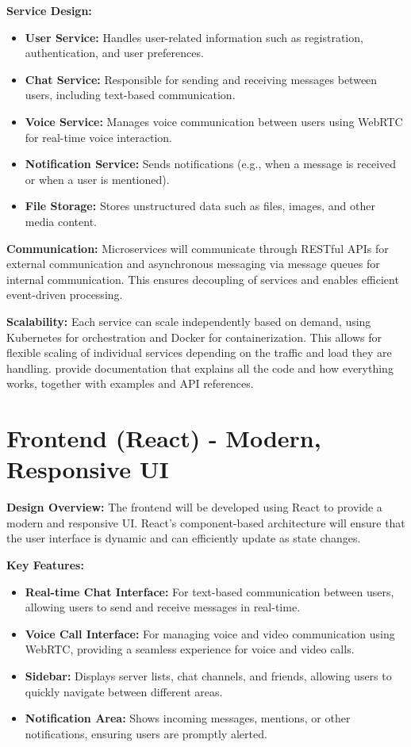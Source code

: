 \documentclass[12pt]{report}
\begin{document}
\textbf{Service Design:}
\begin{itemize}
    \item \textbf{User Service:} Handles user-related information such as registration, authentication, and user preferences.
    \item \textbf{Chat Service:} Responsible for sending and receiving messages between users, including text-based communication.
    \item \textbf{Voice Service:} Manages voice communication between users using WebRTC for real-time voice interaction.
    \item \textbf{Notification Service:} Sends notifications (e.g., when a message is received or when a user is mentioned).
    \item \textbf{File Storage:} Stores unstructured data such as files, images, and other media content.
\end{itemize}

\textbf{Communication:} Microservices will communicate through RESTful APIs for external communication and asynchronous messaging via message queues for internal communication. This ensures decoupling of services and enables efficient event-driven processing.

\textbf{Scalability:} Each service can scale independently based on demand, using Kubernetes for orchestration and Docker for containerization. This allows for flexible scaling of individual services depending on the traffic and load they are handling.
 provide documentation that explains all the code and how everything works, together with examples and API references. 

\section{Frontend (React) - Modern, Responsive UI}

\textbf{Design Overview:} The frontend will be developed using React to provide a modern and responsive UI. React's component-based architecture will ensure that the user interface is dynamic and can efficiently update as state changes.

\textbf{Key Features:}
\begin{itemize}
    \item \textbf{Real-time Chat Interface:} For text-based communication between users, allowing users to send and receive messages in real-time.
    \item \textbf{Voice Call Interface:} For managing voice and video communication using WebRTC, providing a seamless experience for voice and video calls.
    \item \textbf{Sidebar:} Displays server lists, chat channels, and friends, allowing users to quickly navigate between different areas.
    \item \textbf{Notification Area:} Shows incoming messages, mentions, or other notifications, ensuring users are promptly alerted.
\end{itemize}
\end{document}
